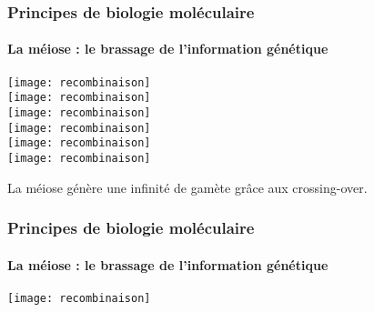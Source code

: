 \begin{frame}
\frametitle{Principes de biologie moléculaire}
\framesubtitle{La méiose : le brassage de l'information génétique}

\begin{overprint}
\centering\texttt{[image: recombinaison]}\\
\centering\texttt{[image: recombinaison]}\\
\centering\texttt{[image: recombinaison]}\\
\centering\texttt{[image: recombinaison]}\\
\centering\texttt{[image: recombinaison]}\\
\centering\texttt{[image: recombinaison]}\\
\end{overprint}

\begin{block}{}
\centering La méiose génère une infinité de gamète grâce aux crossing-over.
\end{block}

\end{frame}


\begin{frame}
\frametitle{Principes de biologie moléculaire}
\framesubtitle{La méiose : le brassage de l'information génétique}

\begin{center}
\texttt{[image: recombinaison]}
\end{center}

\end{frame}

